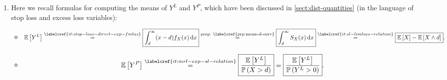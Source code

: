 \begin{enumerate}
\item \label{it:yl-yp-mean}
Here we recall formulas for computing the means of \(Y^L\) and \(Y^P\), which
have been discussed in \cref{sect:dist-quantities} (in the language of stop
loss and excess loss variables):
\begin{itemize}
\item
\[
\expv{Y^L}\overset{\labelcref{it:stop-loss-direct-exp-fmlas}}{=}
\boxed{\int_{d}^{\infty}(x-d)f_X(x)\dd{x}}\overset{\text{prop.\ \labelcref{prp:mean-sl-surv}}}{=}
\boxed{\int_{d}^{\infty}S_X(x)\dd{x}}\overset{\labelcref{it:sl-limloss-relation}}{=}
\boxed{\expv{X}-\expv{X\wedge d}}.
\]
\item
\[
\expv{Y^P}\overset{\labelcref{it:mrl-exp-sl-relation}}{=}\boxed{\frac{\expv{Y^L}}{\prob{X>d}}}
=\boxed{\frac{\expv{Y^L}}{\prob{Y^L>0}}}.
\]
\end{itemize}
\end{enumerate}
